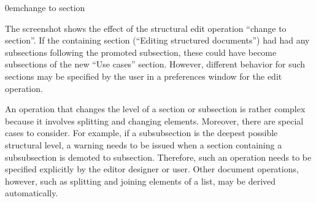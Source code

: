 \documentclass{entcs}
\begin{document}
{0em}{\small change to section}
 
The screenshot shows the effect of the structural edit operation ``change to section''. If the containing section (``Editing structured documents'') had had any subsections following the promoted subsection, these could have become subsections of the new ``Use cases'' section. However, different behavior for such sections may be specified by the user in a preferences window for the edit operation.

An operation that changes the level of a section or subsection is rather complex because it involves splitting and changing elements. Moreover, there are special cases to consider. For example, if a subsubsection is the deepest possible structural level, a warning needs to be issued when a section containing a subsubsection is demoted to subsection. Therefore, such an operation needs to be specified explicitly by the editor designer or user. Other document operations, however, such as splitting and joining elements of a list, may be derived automatically.
\end{document}
